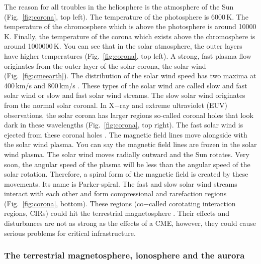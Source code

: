 \documentclass[sn-aps]{sn-jnl}%
\begin{document}
The reason for all troubles in the heliosphere is the atmosphere of the Sun (Fig.~\ref{fig:corona}, top left). The temperature of the photosphere is 6000\,K. The temperature of the chromosphere which is above the photosphere is around 10000\,K. Finally, the temperature of the corona which exists above the chromosphere is around 1000000\,K. You can see that in the solar atmosphere, the outer layers have higher temperatures (Fig.~\ref{fig:corona}, top left). A strong, fast plasma flow originates from the outer layer of the solar corona, the solar wind (Fig.~\ref{fig:cmeearth}). The distribution of the solar wind speed has two maxima at 400\,km/s and 800\,km/s \cite{mccomas98:_ulyss}. These types of the solar wind are called slow and fast solar wind or slow and fast solar wind streams. The slow solar wind originates from the normal solar coronal. In X$-$ray and extreme ultraviolet (EUV) observations, the solar corona has larger regions so-called coronal holes that look dark in these wavelengths (Fig.~\ref{fig:corona}, top right). The fast solar wind is ejected from these coronal holes \cite{scherer05:_space_weath,stix04:_sun_introd}. The magnetic field lines move alongside with the solar wind plasma. You can say the magnetic field lines are frozen in the solar wind plasma. The solar wind moves radially outward and the Sun rotates. Very soon, the angular speed of the plasma will be less than the angular speed of the solar rotation. Therefore, a spiral form of the magnetic field is created by these movements. Its name is Parker-spiral. The fast and slow solar wind streams interact with each other and form compressional and rarefaction regions (Fig.~\ref{fig:corona}, bottom). These regions (co$-$called corotating interaction regions, CIRs) could hit the terrestrial magnetosphere \cite{scherer05:_space_weath}. Their effects and disturbances are not as strong as the effects of a CME, however, they could cause serious problems for critical infrastructure. 

\subsubsection{The terrestrial magnetosphere, ionosphere and the aurora}
\label{sec:magn}
\end{document}

